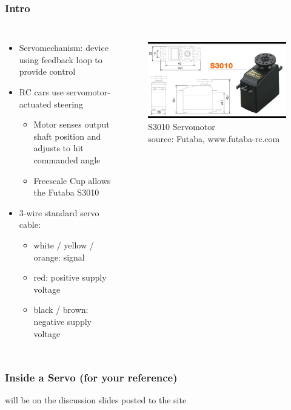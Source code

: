 \documentclass{beamer}
\begin{document}
\begin{frame}
\frametitle{Intro}
\begin{columns}[t]
\begin{itemize}
  \item Servomechanism: device using feedback loop to provide control
  \item RC cars use servomotor-actuated steering
  \begin{itemize}
    \item Motor senses output shaft position and adjusts to hit commanded angle
    \item Freescale Cup allows the Futaba S3010
  \end{itemize}
  \item 3-wire standard servo cable:
  \begin{itemize}
    \item white / yellow / orange: signal
    \item red: positive supply voltage
    \item black / brown: negative supply voltage
  \end{itemize}
\end{itemize}

\begin{figure}
  \centering
  \includegraphics[width=1.0\columnwidth]{images-dis3/specs-futm0043} \\
  S3010 Servomotor \\
  {\tiny source: Futaba, www.futaba-rc.com}
\end{figure}
\end{columns}
\end{frame}

\begin{frame}
\frametitle{Inside a Servo {\small (for your reference)}}
will be on the discussion slides posted to the site
\end{frame}
\end{document}
